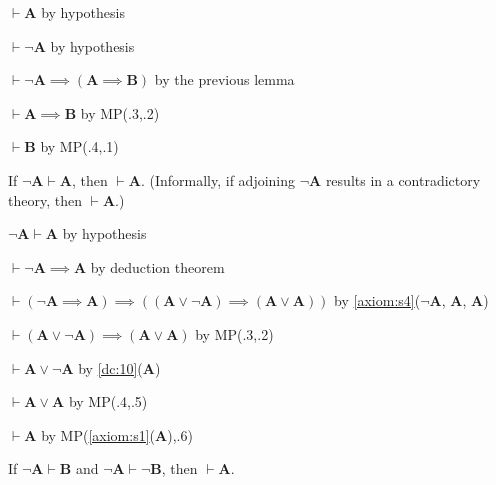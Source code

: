\documentclass{amsart}%
\newcommand\metavariable[1]{\boldsymbol{#1}}
\begin{document}
\begin{pf}
\item $\vdash\metavariable{A}$ by hypothesis
\item $\vdash\neg\metavariable{A}$ by hypothesis
\item $\vdash\neg\metavariable{A}\implies(\metavariable{A}\implies\metavariable{B})$
  by the previous lemma
\item $\vdash\metavariable{A}\implies\metavariable{B}$ by MP(.3,.2)
\item $\vdash\metavariable{B}$ by MP(.4,.1)
\end{pf}

\begin{lemma}\label{lm:prop:explode}
If $\neg\metavariable{A}\vdash\metavariable{A}$, then $\vdash\metavariable{A}$.
(Informally, if adjoining $\neg\metavariable{A}$ results in a
contradictory theory, then $\vdash\metavariable{A}$.)
\end{lemma}

\begin{pf}
\item $\neg\metavariable{A}\vdash\metavariable{A}$ by hypothesis
\item $\vdash\neg\metavariable{A}\implies\metavariable{A}$ by deduction theorem
\item $\vdash(\neg\metavariable{A}\implies\metavariable{A})\implies((\metavariable{A}\lor\neg\metavariable{A})\implies(\metavariable{A}\lor\metavariable{A}))$
  by \ref{axiom:s4}($\neg\metavariable{A}$, $\metavariable{A}$, $\metavariable{A}$)
\item $\vdash(\metavariable{A}\lor\neg\metavariable{A})\implies(\metavariable{A}\lor\metavariable{A})$
  by MP(.3,.2)
\item $\vdash\metavariable{A}\lor\neg\metavariable{A}$ by \ref{dc:10}($\metavariable{A}$)
\item $\vdash\metavariable{A}\lor\metavariable{A}$ by MP(.4,.5)
\item $\vdash\metavariable{A}$ by MP(\ref{axiom:s1}($\metavariable{A}$),.6)
\end{pf}

\begin{dc}\label{dc:15}
If $\neg\metavariable{A}\vdash\metavariable{B}$ and
$\neg\metavariable{A}\vdash\neg\metavariable{B}$, then
$\vdash\metavariable{A}$.
\end{dc}
\end{document}

